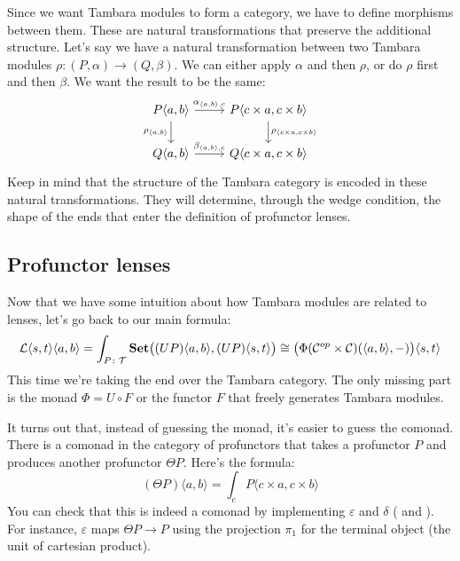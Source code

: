 \documentclass[DaoFP]{subfiles}
\begin{document}
Since we want Tambara modules to form a category, we have to define morphisms between them. These are natural transformations that preserve the additional structure. Let's say we have a natural transformation between two Tambara modules $\rho \colon (P, \alpha) \to (Q, \beta) $. We can either apply $\alpha$ and then $\rho$, or do $\rho$ first and then  $\beta$. We want the result to be the same:
\[
 \begin{tikzcd}
  P \langle a, b \rangle
 \arrow[d, "{ \rho_{\langle a, b \rangle}}"']
 \arrow[r, "{ \alpha_{\langle a, b \rangle, c}}"]
  &  P \langle c \times a, c \times b \rangle
  \arrow[d, "{ \rho_{\langle c \times a, c \times b \rangle}}"]
\\
   Q \langle a, b \rangle
 \arrow[r, "{ \beta_{\langle a, b \rangle, c}}"]
 &  Q \langle c \times a, c \times b \rangle
 \end{tikzcd}
\]
Keep in mind that the structure of the Tambara category is encoded in these natural transformations. They will determine, through the wedge condition, the shape of the ends that enter the definition of profunctor lenses.

\subsection{Profunctor lenses}

Now that we have some intuition about how Tambara modules are related to lenses, let's go back to our main formula:
\[  \mathcal{L}\langle s, t\rangle \langle a, b \rangle =\int_{P \colon \mathcal{T}} \mathbf{Set} \big((U P) \langle a, b\rangle, (U P) \langle s, t\rangle \big) \cong \big( \Phi (\mathcal{C}^{op} \times \mathcal{C}) (\langle a, b\rangle ,-) \big) \langle s, t\rangle \]
This time we're taking the end over the Tambara category. The only missing part is the monad $\Phi = U \circ F$ or the functor $F$ that freely generates Tambara modules.

It turns out that, instead of guessing the monad, it's easier to guess the comonad. There is a comonad in the category of profunctors that takes a profunctor $P$ and produces another profunctor $\Theta P$. Here's the formula:
\[(\Theta P) \langle a, b \rangle = \int_c P \langle c \times a, c \times b \rangle \]
You can check that this is indeed a comonad by implementing $\varepsilon$ and $\delta$ ( and ). For instance, $\varepsilon$ maps $\Theta P \to P$ using the projection $\pi_1$ for the terminal object (the unit of cartesian product).
\end{document}
